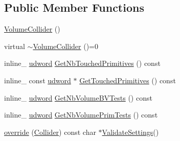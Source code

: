 \subsection*{Public Member Functions}
\begin{DoxyCompactItemize}
\item 
\hyperlink{classOpcode_1_1VolumeCollider_a47d5798a198bc5a46bf03b27dbd6f58d}{Volume\+Collider} ()
\item 
virtual \hyperlink{classOpcode_1_1VolumeCollider_a65b12ef17cd49013615330a4a1510beb}{$\sim$\+Volume\+Collider} ()=0
\item 
inline\+\_\+ \hyperlink{IceTypes_8h_a44c6f1920ba5551225fb534f9d1a1733}{udword} \hyperlink{classOpcode_1_1VolumeCollider_ab4ab03fdecae438e89ef98433b7fc6c1}{Get\+Nb\+Touched\+Primitives} () const 
\item 
inline\+\_\+ const \hyperlink{IceTypes_8h_a44c6f1920ba5551225fb534f9d1a1733}{udword} $\ast$ \hyperlink{classOpcode_1_1VolumeCollider_ac85a0c717bc3d3424af31becc7abbebd}{Get\+Touched\+Primitives} () const 
\item 
inline\+\_\+ \hyperlink{IceTypes_8h_a44c6f1920ba5551225fb534f9d1a1733}{udword} \hyperlink{classOpcode_1_1VolumeCollider_aac4e185117e82155887bd58b4fa839bb}{Get\+Nb\+Volume\+B\+V\+Tests} () const 
\item 
inline\+\_\+ \hyperlink{IceTypes_8h_a44c6f1920ba5551225fb534f9d1a1733}{udword} \hyperlink{classOpcode_1_1VolumeCollider_a2d2ff106ee0a5869ba10996b8910ab03}{Get\+Nb\+Volume\+Prim\+Tests} () const 
\item 
\hyperlink{classOpcode_1_1VolumeCollider_ab346dafee72ff572798ea8500455c27d}{override} (\hyperlink{classOpcode_1_1Collider}{Collider}) const char $\ast$\hyperlink{classOpcode_1_1Collider_a9099aa79f7b57fe4018f37e967cc6be5}{Validate\+Settings}()
\end{DoxyCompactItemize}
